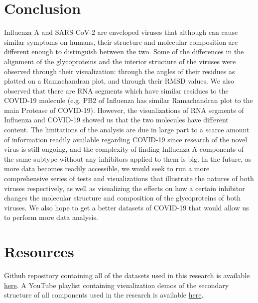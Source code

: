 \documentclass[conference]{IEEEtran}
\begin{document}
\section{Conclusion}
Influenza A and SARS-CoV-2 are enveloped viruses that although  can cause similar symptoms on humans, their structure and molecular composition are different enough to distinguish between the two. Some of the differences in the alignment of the glycoproteins and the interior structure of the viruses were observed through their visualization: through the angles of their residues as plotted on a Ramachandran plot, and through their RMSD values. We also observed that there are RNA segments which have similar residues to the COVID-19 molecule (e.g. PB2 of Influenza has similar Ramachandran plot to the main Protease of COVID-19). However, the visualizations of RNA segments of Influenza and COVID-19 showed us that the two molecules have different content. The limitations of the analysis are due in large part to a scarce amount of information readily available regarding COVID-19 since research of the novel virus is still ongoing, and the complexity of finding Influenza A components of the same subtype without any inhibitors applied to them is big. In the future, as more data becomes readily accessible, we would seek to run a more comprehensive series of tests and visualizations that illustrate the natures of both viruses respectively, as well as visualizing the effects on how a certain inhibitor changes the molecular structure and composition of the glycoproteins of both viruses. We also hope to get a better datasets of COVID-19 that would allow us to perform more data analysis.

\section{Resources}
Github  repository  containing  all  of  the  datasets  used  in this research is available \href{https://github.com/YarkaS/Scientific-Visualization-of-COVID-19-and-Influenza}{here}. A YouTube playlist containing visualization demos of the secondary structure of all components used in the research is available \href{https://www.youtube.com/playlist?list=PLy6A1AABOE1kK2v1RD5oP3muDWzIhSUiL}{here}.





\end{document}
